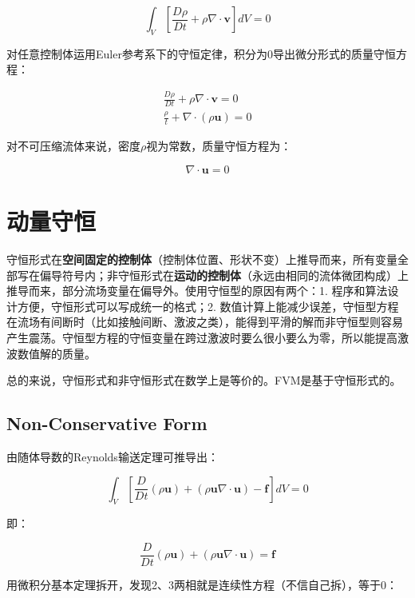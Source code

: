 \begin{equation}
\int_V \left[\frac{D\rho}{Dt} + \rho\nabla\cdot\mathbf{v} \right]dV = 0
\end{equation}

对任意控制体运用Euler参考系下的守恒定律，积分为0导出微分形式的质量守恒方程：

\begin{gather}
\frac{D\rho}{Dt} + \rho\nabla\cdot\mathbf{v} = 0 \\
\frac{\rho}{t} + \nabla\cdot(\rho\bm{u}) = 0
\end{gather}

对不可压缩流体来说，密度$ \rho $视为常数，质量守恒方程为：

\begin{equation}
\nabla\cdot\bm{u} = 0
\end{equation}

\section{动量守恒}

守恒形式在\textbf{空间固定的控制体}（控制体位置、形状不变）上推导而来，所有变量全部写在偏导符号内；非守恒形式在\textbf{运动的控制体}（永远由相同的流体微团构成）上推导而来，部分流场变量在偏导外。使用守恒型的原因有两个：1. 程序和算法设计方便，守恒形式可以写成统一的格式；2. 数值计算上能减少误差，守恒型方程在流场有间断时（比如接触间断、激波之类），能得到平滑的解而非守恒型则容易产生震荡。守恒型方程的守恒变量在跨过激波时要么很小要么为零，所以能提高激波数值解的质量。

总的来说，守恒形式和非守恒形式在数学上是等价的。FVM是基于守恒形式的。

\subsection{Non-Conservative Form}
由随体导数的Reynolds输送定理可推导出：

\begin{equation}
\int_{V}\left[ \frac{D}{Dt}(\rho\bm{u}) + (\rho\bm{u}\nabla\cdot \bm{u}) - \bm{f} \right]dV = 0
\end{equation}

即：

\begin{equation}
\frac{D}{Dt}(\rho\bm{u}) + (\rho\bm{u}\nabla\cdot \bm{u}) = \bm{f}
\end{equation}

用微积分基本定理拆开，发现2、3两相就是连续性方程（不信自己拆），等于0：

